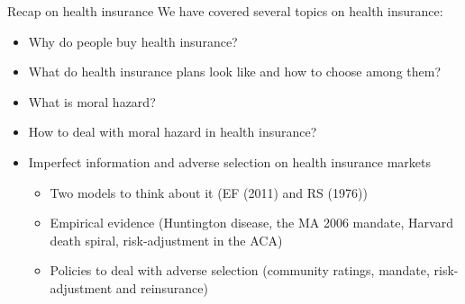 \begin{frame}{Recap on health insurance}
    We have covered several topics on health insurance:
    \begin{itemize}
        \item Why do people buy health insurance?
        \item What do health insurance plans look like and how to choose among them?
        \item What is moral hazard?
        \item How to deal with moral hazard in health insurance?
        \item Imperfect information and adverse selection on health insurance markets
        \begin{itemize}
            \item Two models to think about it {\footnotesize {\color{gray} (EF (2011) and RS (1976))}}
            \item Empirical evidence {\footnotesize {\color{gray} (Huntington disease, the MA 2006 mandate, Harvard death spiral, risk-adjustment in the ACA)}} 
            \item Policies to deal with adverse selection {\footnotesize {\color{gray} (community ratings, mandate, risk-adjustment and reinsurance)}}
        \end{itemize}
    \end{itemize}
    \pause

    \vspace{3mm}



\end{frame}
